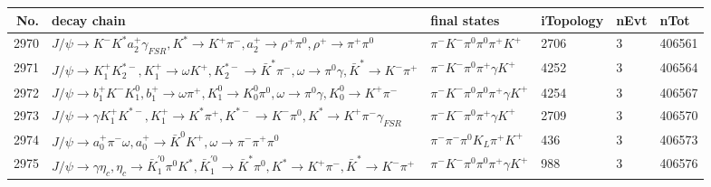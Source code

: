 \begin{table}[htbp] 
\begin{center}
\begin{small}
\begin{tabular}{rlllll}\hline\hline
 No. & decay chain & final states &  iTopology & nEvt & nTot \\\hline
2970&$J/\psi       \rightarrow K^{-}          K^{*}          a_{2}^{+}      \gamma_{FSR} , K^{*}           \rightarrow K^{+}          \pi^{-}        , a_{2}^{+}       \rightarrow \rho^{+}      \pi^{0}        , \rho^{+}       \rightarrow \pi^{+}        \pi^{0}        $&$\pi^{-}        K^{-}          \pi^{0}        \pi^{0}        \pi^{+}        K^{+}          $& 2706&    3&406561\\
2971&$J/\psi       \rightarrow K_1^{+}        K_2^{*-}       , K_1^{+}         \rightarrow \omega         K^{+}          , K_2^{*-}        \rightarrow \bar{K}^{*}   \pi^{-}        , \omega          \rightarrow \pi^{0}        \gamma       , \bar{K}^{*}    \rightarrow K^{-}          \pi^{+}        $&$\pi^{-}        K^{-}          \pi^{0}        \pi^{+}        \gamma       K^{+}          $& 4252&    3&406564\\
2972&$J/\psi       \rightarrow b_{1}^{+}      K^{-}          K_1^{0}        , b_{1}^{+}       \rightarrow \omega         \pi^{+}        , K_1^{0}         \rightarrow K_0^{0}        \pi^{0}        , \omega          \rightarrow \pi^{0}        \gamma       , K_0^{0}         \rightarrow K^{+}          \pi^{-}        $&$\pi^{-}        K^{-}          \pi^{0}        \pi^{0}        \pi^{+}        \gamma       K^{+}          $& 4254&    3&406567\\
2973&$J/\psi       \rightarrow \gamma       K_1^{+}        K^{*-}         , K_1^{+}         \rightarrow K^{*}          \pi^{+}        , K^{*-}          \rightarrow K^{-}          \pi^{0}        , K^{*}           \rightarrow K^{+}          \pi^{-}        \gamma_{FSR} $&$\pi^{-}        K^{-}          \pi^{0}        \pi^{+}        \gamma       K^{+}          $& 2709&    3&406570\\
2974&$J/\psi       \rightarrow a_{0}^{+}      \pi^{-}        \omega         , a_{0}^{+}       \rightarrow \bar{K}^{0}   K^{+}          , \omega          \rightarrow \pi^{-}        \pi^{+}        \pi^{0}        $&$\pi^{-}        \pi^{-}        \pi^{0}        K_{L}          \pi^{+}        K^{+}          $&  436&    3&406573\\
2975&$J/\psi       \rightarrow \gamma       \eta_{c}    , \eta_{c}     \rightarrow \bar{K}_1^{'0}\pi^{0}        K^{*}          , \bar{K}_1^{'0} \rightarrow \bar{K}^{*}   \pi^{0}        , K^{*}           \rightarrow K^{+}          \pi^{-}        , \bar{K}^{*}    \rightarrow K^{-}          \pi^{+}        $&$\pi^{-}        K^{-}          \pi^{0}        \pi^{0}        \pi^{+}        \gamma       K^{+}          $&  988&    3&406576\\

\end{tabular}
\end{small}
\end{center}
\end{table}
